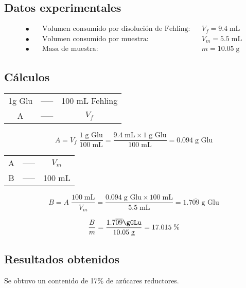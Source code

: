 \documentclass[a4paper,12pt]{article} %
\newcommand{\liney}{-----}
\newcommand{\gGlu}{\;\text{g Glu}}
\newcommand{\mL}{\;\text{mL}}
\begin{document}
\subsection{Datos experimentales}

\begin{align*}
 \bullet& \quad \text{Volumen consumido por disolución de Fehling:} && V_f = 9.4   \;\text{mL} \\
 \bullet& \quad \text{Volumen consumido por muestra:}               && V_m = 5.5   \;\text{mL} \\
 \bullet& \quad \text{Masa de muestra:}                             && m   = 10.05 \;\text{g}
\end{align*}


\subsection{Cálculos}


\begin{table}[H]
    \centering
    \begin{tabular}{ccc}
        1g Glu & \liney & 100 mL Fehling \\
        A      & \liney & $V_f$
    \end{tabular}
\end{table}

\[ A = V_f \;\frac{1 \gGlu}{100 \mL} = \frac{9.4 \mL \times 1 \gGlu}{100 \mL} = 0.094 \gGlu\]

\newpage

\begin{table}[H]
    \centering
    \begin{tabular}{ccc}
        A & \liney & $V_m$ \\
        B      & \liney & 100 mL
    \end{tabular}
\end{table}

\[ B = A\;\frac{100\mL}{V_m} = \frac{0.094\gGlu \times 100\mL}{5.5\mL} = 1.7\overline{09} \gGlu \]


\[ \frac{B}{m} = \frac{1.7\overline{09} \gGLu}{10.05\;\text{g}} = 17.015 \;\% \] %


\subsection{Resultados obtenidos}
Se obtuvo un contenido de 17\% de azúcares reductores.
\end{document}
